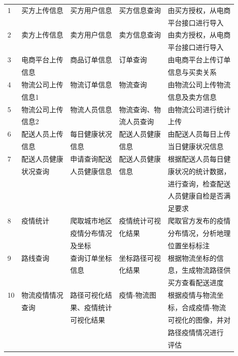 \documentclass[12pt]{article}
\begin{document}
\begin{center}
\begin{supertabular}{lllll}
	1 &	买方上传信息 &	买方用户信息	& 买方信息查询 &	由买方授权，从电商 \\ &&&& 平台接口进行导入 \\
	2 &	卖方上传信息 &	卖方用户信息 &	卖方信息查询 & 由卖方授权，从电商 \\ &&&& 平台接口进行导入 \\
	3 &	电商平台上传 &	商品订单信息 &	订单查询 &	由电商平台上传订单 \\ & 信息 &&& 信息与买卖关系 \\
	4 & 物流公司上传 & 物流订单信息  &	物流查询  &	由物流公司上传物流 \\ & 信息1 &&& 信息及卖方信息 \\
	5 &	物流公司上传 &	物流人员信息 &	物流查询、物 &	由物流公司进行统计 \\ & 信息2 & & 流人员查询 & 上传 \\
	6 &	配送人员上传 &	每日健康状况 &	配送人员健康 &	由配送人员每日上传 \\ & 信息 & 信息 & 信息 & 当日健康状况信息 \\
	7 &	配送人员健康 &	申请查询配送 &	配送人员健康 &	根据配送人员每日健 \\ & 状况查询 & 人员健康信息 & 信息 & 康状况的统计数据，\\ &&&& 进行查询，检查配送 \\ &&&& 人员健康自检是否满 \\ &&&& 足要求 \\
	8 &	疫情统计 &	爬取城市地区 &	疫情统计可视 &	爬取官方发布的疫情 \\ && 疫情分布情况 & 化结果 & 分布情况，分析地理 \\ && 及坐标 && 位置坐标标注 \\
	9 &	路线查询 &	查询订单坐标 &	坐标路径可视 &	根据物流坐标的信 \\ && 信息 & 化结果 & 息，生成物流路径供 \\ &&&& 买方查看配送进度 \\
	10 &	物流疫情情况 &	路径可视化结 & 疫情-物流图 &	根据疫情与物流坐 \\ & 查询 & 果、疫情统计 && 标，合成疫情-物流 \\ && 可视化结果 && 可视化的图像，并对 \\ &&&& 路径疫情情况进行 \\ &&&& 评估 \\
\end{supertabular}
\end{center}
\end{document}
